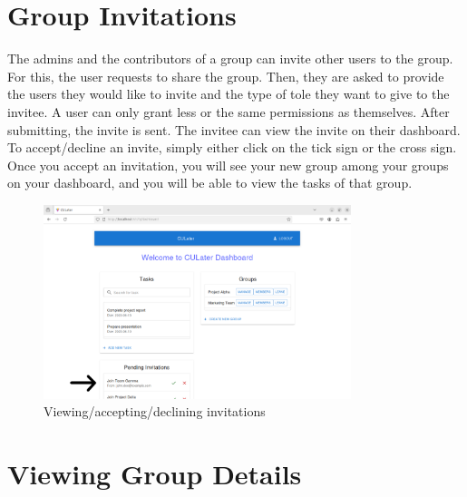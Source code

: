 \documentclass{scrreprt}
\begin{document}
\chapter{Group Invitations}

The admins and the contributors of a group can invite other users to the group. For this, the user requests to share the group. Then, they are asked to provide the users they would like to invite and the type of tole they want to give to the invitee. A user can only grant less or the same permissions as themselves. After submitting, the invite is sent. The invitee can view the invite on their dashboard.\\

To accept/decline an invite, simply either click on the tick sign or the cross sign. Once you accept an invitation, you will see your new group among your groups on your dashboard, and you will be able to view the tasks of that group.\\
\begin{figure}[htbp]
        \centering
        \includegraphics[width=0.8\textwidth]{invitation.png}
	\caption{Viewing/accepting/declining invitations}
	\label{fig:my_label}
\end{figure}

\chapter{Viewing Group Details}
\end{document}
